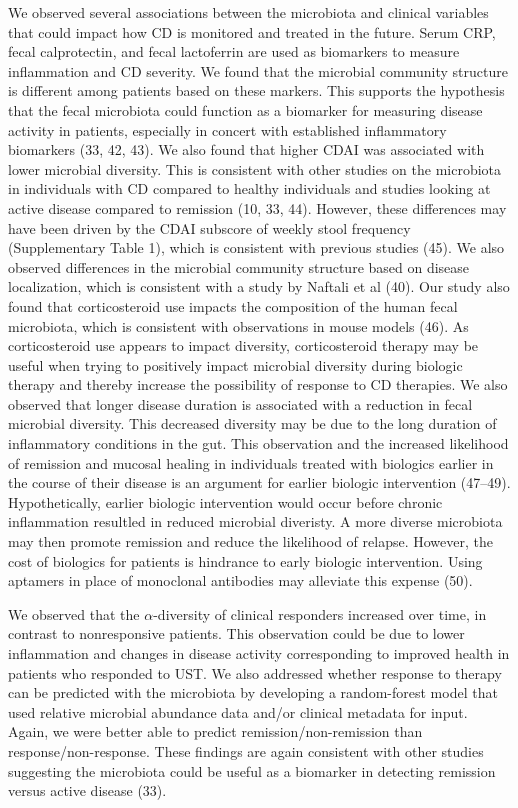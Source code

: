 \documentclass[11pt,]{article}
\begin{document}
We observed several associations between the microbiota and clinical
variables that could impact how CD is monitored and treated in the
future. Serum CRP, fecal calprotectin, and fecal lactoferrin are used as
biomarkers to measure inflammation and CD severity. We found that the
microbial community structure is different among patients based on these
markers. This supports the hypothesis that the fecal microbiota could
function as a biomarker for measuring disease activity in patients,
especially in concert with established inflammatory biomarkers (33, 42,
43). We also found that higher CDAI was associated with lower microbial
diversity. This is consistent with other studies on the microbiota in
individuals with CD compared to healthy individuals and studies looking
at active disease compared to remission (10, 33, 44). However, these
differences may have been driven by the CDAI subscore of weekly stool
frequency (Supplementary Table 1), which is consistent with previous
studies (45). We also observed differences in the microbial community
structure based on disease localization, which is consistent with a
study by Naftali et al (40). Our study also found that corticosteroid
use impacts the composition of the human fecal microbiota, which is
consistent with observations in mouse models (46). As corticosteroid use
appears to impact diversity, corticosteroid therapy may be useful when
trying to positively impact microbial diversity during biologic therapy
and thereby increase the possibility of response to CD therapies. We
also observed that longer disease duration is associated with a
reduction in fecal microbial diversity. This decreased diversity may be
due to the long duration of inflammatory conditions in the gut. This
observation and the increased likelihood of remission and mucosal
healing in individuals treated with biologics earlier in the course of
their disease is an argument for earlier biologic intervention (47--49).
Hypothetically, earlier biologic intervention would occur before chronic
inflammation resultled in reduced microbial diveristy. A more diverse
microbiota may then promote remission and reduce the likelihood of
relapse. However, the cost of biologics for patients is hindrance to
early biologic intervention. Using aptamers in place of monoclonal
antibodies may alleviate this expense (50).

We observed that the \({\alpha}\)-diversity of clinical responders
increased over time, in contrast to nonresponsive patients. This
observation could be due to lower inflammation and changes in disease
activity corresponding to improved health in patients who responded to
UST. We also addressed whether response to therapy can be predicted with
the microbiota by developing a random-forest model that used relative
microbial abundance data and/or clinical metadata for input. Again, we
were better able to predict remission/non-remission than
response/non-response. These findings are again consistent with other
studies suggesting the microbiota could be useful as a biomarker in
detecting remission versus active disease (33).
\end{document}
